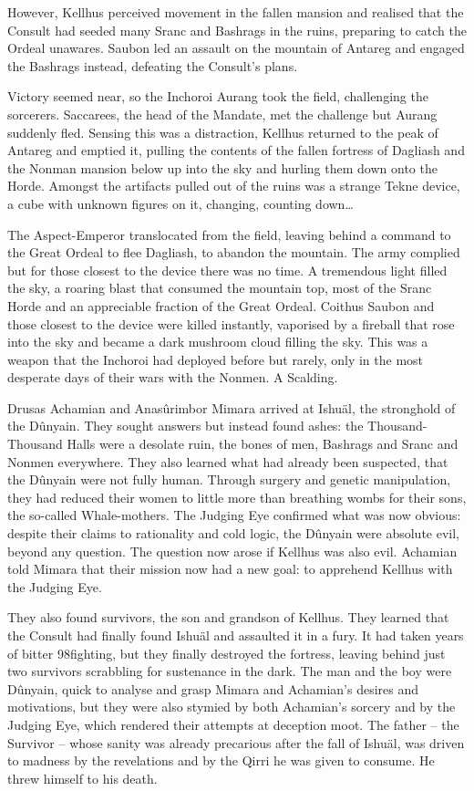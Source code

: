 \documentclass[]{book}
\begin{document}
However, Kellhus perceived movement in the fallen mansion and realised that the
Consult had seeded many Sranc and Bashrags in the ruins, preparing to catch the
Ordeal unawares. Saubon led an assault on the mountain of Antareg and engaged the
Bashrags instead, defeating the Consult's plans.

Victory seemed near, so the Inchoroi Aurang took the field, challenging the sorcerers.
Saccarees, the head of the Mandate, met the challenge but Aurang suddenly fled.
Sensing this was a distraction, Kellhus returned to the peak of Antareg and emptied it,
pulling the contents of the fallen fortress of Dagliash and the Nonman mansion below
up into the sky and hurling them down onto the Horde. Amongst the artifacts pulled
out of the ruins was a strange Tekne device, a cube with unknown figures on it,
changing, counting down\ldots{}

The Aspect-Emperor translocated from the field, leaving behind a command to the
Great Ordeal to flee Dagliash, to abandon the mountain. The army complied but for
those closest to the device there was no time. A tremendous light filled the sky, a
roaring blast that consumed the mountain top, most of the Sranc Horde and an
appreciable fraction of the Great Ordeal. Coithus Saubon and those closest to the
device were killed instantly, vaporised by a fireball that rose into the sky and became a
dark mushroom cloud filling the sky. This was a weapon that the Inchoroi had
deployed before but rarely, only in the most desperate days of their wars with the
Nonmen. A Scalding.

Drusas Achamian and Anasûrimbor Mimara arrived at Ishuäl, the stronghold of the
Dûnyain. They sought answers but instead found ashes: the Thousand-Thousand Halls
were a desolate ruin, the bones of men, Bashrags and Sranc and Nonmen everywhere.
They also learned what had already been suspected, that the Dûnyain were not fully
human. Through surgery and genetic manipulation, they had reduced their women to
little more than breathing wombs for their sons, the so-called Whale-mothers. The
Judging Eye confirmed what was now obvious: despite their claims to rationality and
cold logic, the Dûnyain were absolute evil, beyond any question. The question now
arose if Kellhus was also evil. Achamian told Mimara that their mission now had a new
goal: to apprehend Kellhus with the Judging Eye.

They also found survivors, the son and grandson of Kellhus. They learned that the
Consult had finally found Ishuäl and assaulted it in a fury. It had taken years of bitter
98fighting, but they finally destroyed the fortress, leaving behind just two survivors
scrabbling for sustenance in the dark. The man and the boy were Dûnyain, quick to
analyse and grasp Mimara and Achamian's desires and motivations, but they were also
stymied by both Achamian's sorcery and by the Judging Eye, which rendered their
attempts at deception moot. The father -- the Survivor -- whose sanity was already
precarious after the fall of Ishuäl, was driven to madness by the revelations and by the
Qirri he was given to consume. He threw himself to his death.
\end{document}
